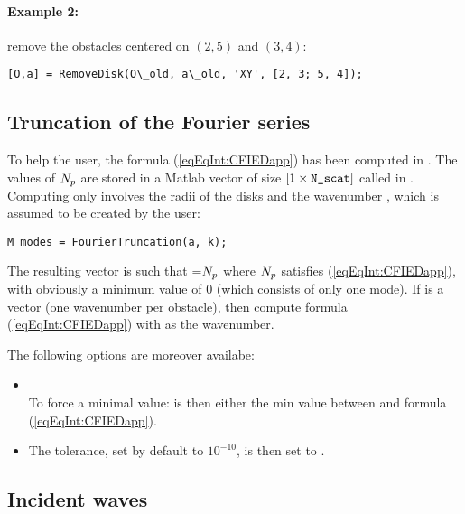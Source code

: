 \paragraph{Example 2:} remove the obstacles centered on $(2,5)$ and $(3,4)$:
\begin{verbatim}
[O,a] = RemoveDisk(O\_old, a\_old, 'XY', [2, 3; 5, 4]);
\end{verbatim}

\subsection{Truncation of the Fourier series}

To help the user, the formula (\ref{eqEqInt:CFIEDapp}) has been computed in \mudiff. The values of $N_{p}$ are stored in a Matlab vector of size $[1\times\texttt{N\_scat}]$ called  in \mudiff. Computing  only involves the radii of the disks and the wavenumber , which is assumed to be created by the user:
\begin{verbatim}
M_modes = FourierTruncation(a, k);
\end{verbatim}
The resulting vector is such that =$N_{p}$ where $N_{p}$ satisfies (\ref{eqEqInt:CFIEDapp}), with obviously a minimum value of $0$ (which consists of only one mode). If  is a vector (one wavenumber per obstacle), then  compute formula (\ref{eqEqInt:CFIEDapp})  with  as the wavenumber.

The following options are moreover availabe:
\begin{itemize}
\item {}\\
To force a minimal value:  is then either the min value between  and formula (\ref{eqEqInt:CFIEDapp}). 
\item{}
The tolerance, set by default to $10^{-10}$, is then set to .
\end{itemize}

\subsection{Incident waves}

\subsubsection{}


